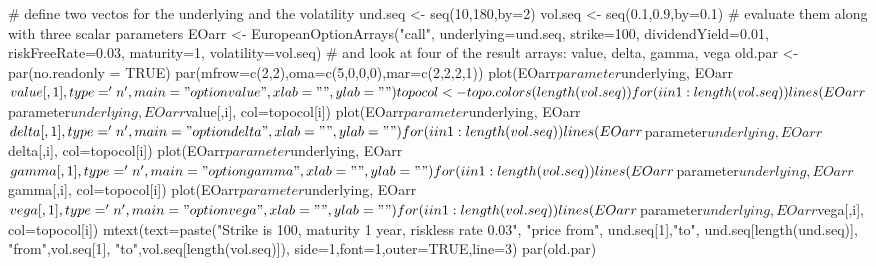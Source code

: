 \begin{Examples}
\begin{ExampleCode}
# define two vectos for the underlying and the volatility
und.seq <- seq(10,180,by=2)
vol.seq <- seq(0.1,0.9,by=0.1)
# evaluate them along with three scalar parameters
EOarr <- EuropeanOptionArrays("call", underlying=und.seq,
                              strike=100, dividendYield=0.01,
                              riskFreeRate=0.03,
                              maturity=1, volatility=vol.seq)
# and look at four of the result arrays: value, delta, gamma, vega
old.par <- par(no.readonly = TRUE)
par(mfrow=c(2,2),oma=c(5,0,0,0),mar=c(2,2,2,1))
plot(EOarr$parameter$underlying, EOarr$value[,1], type='n',
     main="option value", xlab="", ylab="") 
topocol <- topo.colors(length(vol.seq))
for (i in 1:length(vol.seq))
  lines(EOarr$parameter$underlying, EOarr$value[,i], col=topocol[i])
plot(EOarr$parameter$underlying, EOarr$delta[,1],type='n',
     main="option delta", xlab="", ylab="")
for (i in 1:length(vol.seq))
  lines(EOarr$parameter$underlying, EOarr$delta[,i], col=topocol[i])
plot(EOarr$parameter$underlying, EOarr$gamma[,1],type='n',
     main="option gamma", xlab="", ylab="")
for (i in 1:length(vol.seq))
  lines(EOarr$parameter$underlying, EOarr$gamma[,i], col=topocol[i])
plot(EOarr$parameter$underlying, EOarr$vega[,1],type='n',
     main="option vega", xlab="", ylab="")
for (i in 1:length(vol.seq))
  lines(EOarr$parameter$underlying, EOarr$vega[,i], col=topocol[i])
mtext(text=paste("Strike is 100, maturity 1 year, riskless rate 0.03",
        "\nUnderlying price from", und.seq[1],"to", und.seq[length(und.seq)],
        "\nVolatility  from",vol.seq[1], "to",vol.seq[length(vol.seq)]),
      side=1,font=1,outer=TRUE,line=3)
par(old.par)
\end{ExampleCode}
\end{Examples}

